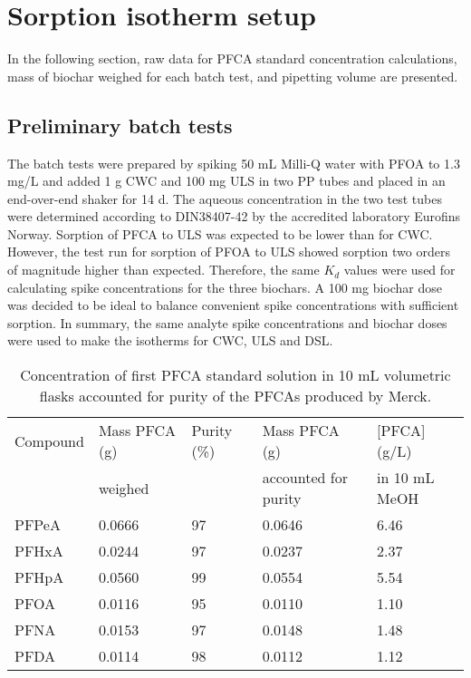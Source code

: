 \chapter{Sorption isotherm setup}\label{appSec:IsothermSetup}
In the following section, raw data for PFCA standard concentration calculations, mass of biochar weighed for each batch test, and pipetting volume are presented.

\section{Preliminary batch tests}
The batch tests were prepared by spiking 50 mL Milli-Q water with PFOA to 1.3 mg/L and added 1 g CWC and 100 mg ULS in two PP tubes and placed in an end-over-end shaker for 14 d. The aqueous concentration in the two test tubes were determined according to DIN38407-42 by the accredited laboratory Eurofins Norway. Sorption of PFCA to ULS was expected to be lower than for CWC. However, the test run for sorption of PFOA to ULS showed sorption two orders of magnitude higher than expected. Therefore, the same $K_d$ values were used for calculating spike concentrations for the three biochars. A 100 mg biochar dose was decided to be ideal to balance convenient spike concentrations with sufficient sorption. In summary, the same analyte spike concentrations and biochar doses were used to make the isotherms for CWC, ULS and DSL.

\begin{table}[h]
\centering
\caption{Concentration of first PFCA standard solution in 10 mL volumetric flasks accounted for purity of the PFCAs produced by Merck.}
\label{appTab:purityMass}
\begin{tabular}{lllll}
\toprule
Compound & Mass PFCA (g) & Purity (\%) & Mass PFCA (g) & {[}PFCA{]} (g/L) \\ 
& weighed & & accounted for purity & in   10 mL MeOH \\ \midrule
PFPeA & 0.0666 & 97 & 0.0646 & 6.46 \\
PFHxA & 0.0244 & 97 & 0.0237 & 2.37 \\
PFHpA & 0.0560 & 99 & 0.0554 & 5.54 \\
PFOA & 0.0116 & 95 & 0.0110 & 1.10 \\
PFNA & 0.0153 & 97 & 0.0148 & 1.48 \\
PFDA & 0.0114 & 98 & 0.0112 & 1.12 \\ \bottomrule
\end{tabular}
\end{table}

